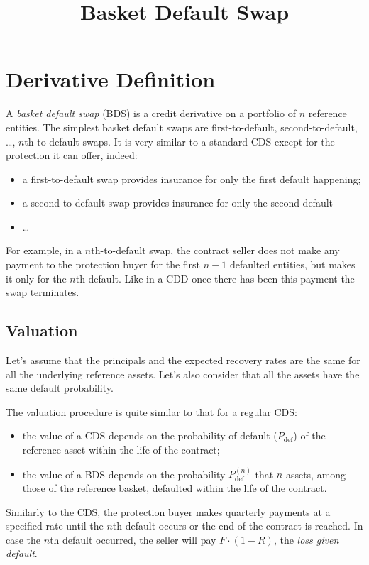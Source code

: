 \documentclass[]{article}
\title{Basket Default Swap}
\author{}
\begin{document}
\maketitle

\section{Derivative Definition}
A \emph{basket default swap} (BDS) is a credit derivative on a portfolio of $n$ reference entities.
The simplest basket default swaps are first-to-default, second-to-default, \ldots, $n$th-to-default swaps. It is very similar to a standard CDS except for the protection it can offer, indeed:
\begin{itemize}
\item a first-to-default swap provides insurance for only the first default happening;
\item a second-to-default swap provides insurance for only the second default
\item \ldots
\end{itemize}

For example, in a $n$th-to-default swap, the contract seller does not make any payment to the protection buyer for the first $n - 1$ defaulted entities, but makes it only for the $n$th default. Like in a CDD once there has been this payment the swap terminates.

\subsection{Valuation}
Let's assume that the principals and the expected recovery rates are the same for all the underlying reference assets. Let's also consider that all the assets have the same default probability.

The valuation procedure is quite similar to that for a regular CDS:
\begin{itemize}
\item the value of a CDS depends on the probability of default ($P_{\textrm{def}}$) of the reference asset within the life of the contract;
\item the value of a BDS depends on the probability $P^{(n)}_{\textrm{def}}$ that $n$ assets, among those of the reference basket, defaulted within the life of the contract.
\end{itemize}

Similarly to the CDS, the protection buyer makes quarterly payments at a specified rate until the $n$th default occurs or the end of the contract is reached. In case the $n$th default occurred, the seller will pay $F\cdot(1 − R)$, the \emph{loss given default}.
\end{document}

